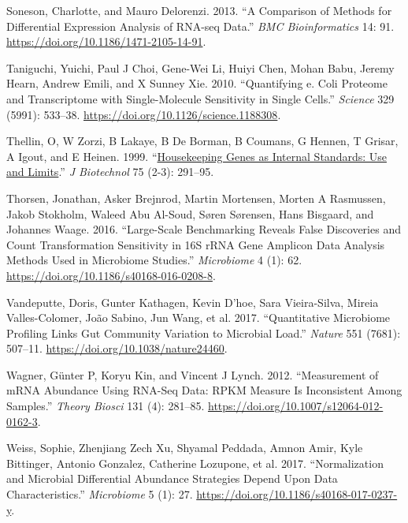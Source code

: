 \documentclass[
]{article}
\newlength{\cslhangindent}
\newlength{\cslentryspacingunit} %
\newenvironment{CSLReferences}[2] %
 {%
  \setlength{\parindent}{0pt}
  \ifodd #1
  \let\oldpar\par
  \def\par{\hangindent=\cslhangindent\oldpar}
  \fi
  \setlength{\parskip}{#2\cslentryspacingunit}
 }%
 {}
\begin{document}
\begin{CSLReferences}{1}{0}
\leavevmode{}%
Soneson, Charlotte, and Mauro Delorenzi. 2013. {``A Comparison of
Methods for Differential Expression Analysis of {RNA-seq} Data.''}
\emph{BMC Bioinformatics} 14: 91.
\url{https://doi.org/10.1186/1471-2105-14-91}.

\leavevmode{}%
Taniguchi, Yuichi, Paul J Choi, Gene-Wei Li, Huiyi Chen, Mohan Babu,
Jeremy Hearn, Andrew Emili, and X Sunney Xie. 2010. {``Quantifying e.
Coli Proteome and Transcriptome with Single-Molecule Sensitivity in
Single Cells.''} \emph{Science} 329 (5991): 533--38.
\url{https://doi.org/10.1126/science.1188308}.

\leavevmode{}%
Thellin, O, W Zorzi, B Lakaye, B De Borman, B Coumans, G Hennen, T
Grisar, A Igout, and E Heinen. 1999.
{``\href{https://www.ncbi.nlm.nih.gov/pubmed/10617337}{Housekeeping
Genes as Internal Standards: Use and Limits}.''} \emph{J Biotechnol} 75
(2-3): 291--95.

\leavevmode{}%
Thorsen, Jonathan, Asker Brejnrod, Martin Mortensen, Morten A Rasmussen,
Jakob Stokholm, Waleed Abu Al-Soud, Søren Sørensen, Hans Bisgaard, and
Johannes Waage. 2016. {``Large-Scale Benchmarking Reveals False
Discoveries and Count Transformation Sensitivity in 16{S} r{RNA} Gene
Amplicon Data Analysis Methods Used in Microbiome Studies.''}
\emph{Microbiome} 4 (1): 62.
\url{https://doi.org/10.1186/s40168-016-0208-8}.

\leavevmode{}%
Vandeputte, Doris, Gunter Kathagen, Kevin D'hoe, Sara Vieira-Silva,
Mireia Valles-Colomer, João Sabino, Jun Wang, et al. 2017.
{``Quantitative Microbiome Profiling Links Gut Community Variation to
Microbial Load.''} \emph{Nature} 551 (7681): 507--11.
\url{https://doi.org/10.1038/nature24460}.

\leavevmode{}%
Wagner, Günter P, Koryu Kin, and Vincent J Lynch. 2012. {``Measurement
of mRNA Abundance Using RNA-Seq Data: RPKM Measure Is Inconsistent Among
Samples.''} \emph{Theory Biosci} 131 (4): 281--85.
\url{https://doi.org/10.1007/s12064-012-0162-3}.

\leavevmode{}%
Weiss, Sophie, Zhenjiang Zech Xu, Shyamal Peddada, Amnon Amir, Kyle
Bittinger, Antonio Gonzalez, Catherine Lozupone, et al. 2017.
{``Normalization and Microbial Differential Abundance Strategies Depend
Upon Data Characteristics.''} \emph{Microbiome} 5 (1): 27.
\url{https://doi.org/10.1186/s40168-017-0237-y}.


\end{CSLReferences}
\end{document}
